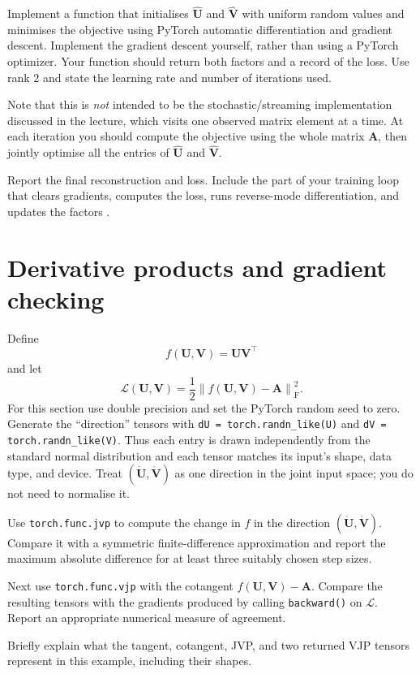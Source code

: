 \documentclass[a4paper]{article}
\begin{document}
\begin{tcolorbox}[parbox=false,title=1.1 Implement an autograd factorisation (2 marks)]
Implement a function that initialises $\hat{\bm U}$ and $\hat{\bm V}$ with uniform random values and minimises the objective using PyTorch automatic differentiation and gradient descent. Implement the gradient descent yourself, rather than using a PyTorch optimizer. Your function should return both factors and a record of the loss. Use rank 2 and state the learning rate and number of iterations used.

Note that this is \emph{not} intended to be the stochastic/streaming implementation discussed in the lecture, which visits one observed matrix element at a time. At each iteration you should compute the objective using the whole matrix $\bm A$, then jointly optimise all the entries of $\hat{\bm U}$ and $\hat{\bm V}$.

Report the final reconstruction and loss. Include the part of your training loop that clears gradients, computes the loss, runs reverse-mode differentiation, and updates the factors .
\end{tcolorbox}

\section{Derivative products and gradient checking}

Define
\begin{equation*}
    f(\bm U,\bm V)=\bm U\bm V^{\top}
\end{equation*}
and let
\begin{equation*}
    \mathcal{L}(\bm U,\bm V)=\frac{1}{2}\left\lVert f(\bm U,\bm V)-\bm A\right\rVert_{\mathrm F}^{2}.
\end{equation*}
For this section use double precision and set the PyTorch random seed to zero. Generate the ``direction'' tensors with \texttt{dU = torch.randn\_like(U)} and \texttt{dV = torch.randn\_like(V)}. Thus each entry is drawn independently from the standard normal distribution and each tensor matches its input's shape, data type, and device. Treat $(\dot{\bm U},\dot{\bm V})$ as one direction in the joint input space; you do not need to normalise it.

\begin{tcolorbox}[parbox=false,title={2.1 Check JVPs, VJPs, and backward (3 marks)}]
Use \texttt{torch.func.jvp} to compute the change in $f$ in the direction $(\dot{\bm U},\dot{\bm V})$. Compare it with a symmetric finite-difference approximation and report the maximum absolute difference for at least three suitably chosen step sizes.

Next use \texttt{torch.func.vjp} with the cotangent $f(\bm U,\bm V)-\bm A$. Compare the resulting tensors with the gradients produced by calling \texttt{backward()} on $\mathcal{L}$. Report an appropriate numerical measure of agreement.

Briefly explain what the tangent, cotangent, JVP, and two returned VJP tensors represent in this example, including their shapes.
\end{tcolorbox}
\end{document}
